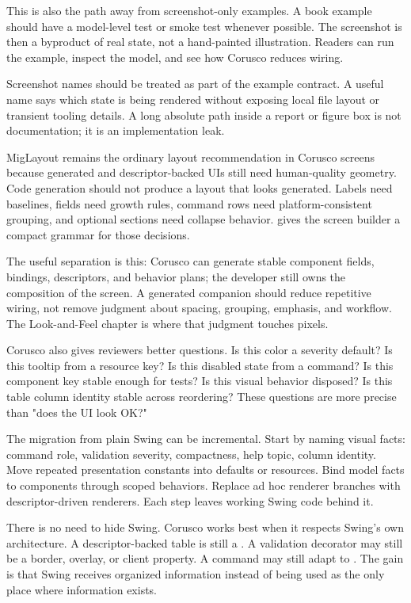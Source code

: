 This is also the path away from screenshot-only examples. A book example should have a model-level test or smoke test whenever possible. The screenshot is then a byproduct of real state, not a hand-painted illustration. Readers can run the example, inspect the model, and see how Corusco reduces wiring.

Screenshot names should be treated as part of the example contract. A useful name says which state is being rendered without exposing local file layout or transient tooling details. A long absolute path inside a report or figure box is not documentation; it is an implementation leak.

MigLayout remains the ordinary layout recommendation in Corusco screens because generated and descriptor-backed UIs still need human-quality geometry. Code generation should not produce a layout that looks generated. Labels need baselines, fields need growth rules, command rows need platform-consistent grouping, and optional sections need collapse behavior. \miglayout{} gives the screen builder a compact grammar for those decisions.

The useful separation is this: Corusco can generate stable component fields, bindings, descriptors, and behavior plans; the developer still owns the composition of the screen. A generated companion should reduce repetitive wiring, not remove judgment about spacing, grouping, emphasis, and workflow. The Look-and-Feel chapter is where that judgment touches pixels.

Corusco also gives reviewers better questions. Is this color a severity default? Is this tooltip from a resource key? Is this disabled state from a command? Is this component key stable enough for tests? Is this visual behavior disposed? Is this table column identity stable across reordering? These questions are more precise than "does the UI look OK?"

The migration from plain Swing can be incremental. Start by naming visual facts: command role, validation severity, compactness, help topic, column identity. Move repeated presentation constants into defaults or resources. Bind model facts to components through scoped behaviors. Replace ad hoc renderer branches with descriptor-driven renderers. Each step leaves working Swing code behind it.

There is no need to hide Swing. Corusco works best when it respects Swing's own architecture. A descriptor-backed table is still a . A validation decorator may still be a border, overlay, or client property. A command may still adapt to . The gain is that Swing receives organized information instead of being used as the only place where information exists.


